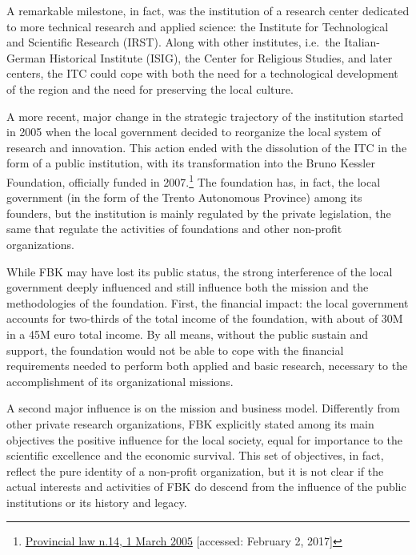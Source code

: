 A remarkable milestone, in fact, was the institution of a research center dedicated to more technical research and applied science: the Institute for Technological and Scientific Research (IRST). Along with other institutes, i.e.\ the Italian-German Historical Institute (ISIG), the Center for Religious Studies, and later centers, the ITC could cope with both the need for a technological development of the region and the need for preserving the local culture. 

A more recent, major change in the strategic trajectory of the institution started in 2005 when the local government decided to reorganize the local system of research and innovation. This action ended with the dissolution of the ITC in the form of a public institution, with its transformation into the Bruno Kessler Foundation, officially funded in 2007.\footnote{
	\href{http://www.consiglio.provincia.tn.it/leggi-e-archivi/codice-provinciale/archivio/Pages/Legge\%20provinciale\%202\%20agosto\%202005,\%20n.\%2014_12567.aspx?zid=6003d625-228e-4e5d-820d-d6cf459dfc36}
	{Provincial law n.14, 1 March 2005}
	[accessed: February 2, 2017]
} The foundation has, in fact, the local government (in the form of the Trento Autonomous Province) among its founders, but the institution is mainly regulated by the private legislation, the same that regulate the activities of foundations and other non-profit organizations. 

While FBK may have lost its public status, the strong interference of the local government deeply influenced and still influence both the mission and the methodologies of the foundation. First, the financial impact: the local government accounts for two-thirds of the total income of the foundation, with about of 30M in a 45M euro total income. By all means, without the public sustain and support, the foundation would not be able to cope with the financial requirements needed to perform both applied and basic research, necessary to the accomplishment of its organizational missions.

A second major influence is on the mission and business model. Differently from other private research organizations, FBK explicitly stated among its main objectives the positive influence for the local society, equal for importance to the scientific excellence and the economic survival. This set of objectives, in fact, reflect the pure identity of a non-profit organization, but it is not clear if the actual interests and activities of FBK do descend from the influence of the public institutions or its history and legacy.

